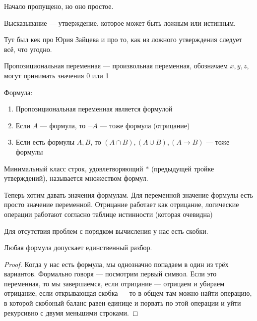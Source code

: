 
Начало пропущено, но оно простое.

Высказывание --- утверждение, которое может быть ложным или истинным.

Тут был кек про Юрия Зайцева и про то, как из ложного утверждения следует всё, что угодно. 

\begin{definition}
Пропозициональная переменная --- произвольная переменная, обозначаем $x, y, z$, могут принимать значения 0 или 1
\end{definition}

\begin{definition}
Формула: 

\begin{enumerate}
	\item{Пропозициональная переменная является формулой}

	\item{Если $A$ --- формула, то $\lnot A$ --- тоже формула (отрицание)}

	\item{Если есть формулы $A, B$, то $(A \cap B), (A \cup B), (A \to B)$ --- тоже формулы}

\end{enumerate}

Минимальный класс строк, удовлетворяющий $*$ (предыдущей тройке утверждений), называется множеством формул.

\end{definition}

Теперь хотим давать значения формулам. Для переменной значение формулы есть просто значение переменной. Отрицание работает как отрицание, логические операции работают согласно таблице истинности (которая очевидна)

Для отсутствия проблем с порядком вычисления у нас есть скобки.

\begin{theorem}
	Любая формула допускает единственный разбор.
\end{theorem}
\begin{proof}
	Когда у нас есть формула, мы однозначно попадаем в один из трёх вариантов. Формально говоря --- посмотрим первый символ. Если это переменная, то мы завершаемся, если отрицание --- отрицаем и убираем отрицание, если открывающая скобка --- то в общем там можно найти операцию, в которой скобоный баланс равен единице и порвать по этой операции и уйти рекурсивно с двумя меньшими строками.
\end{proof}

